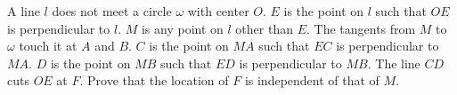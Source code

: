 A line $l$ does not meet a circle $\omega$ with center $O$. $E$ is the point on $l$ such that $OE$ is perpendicular to $l$. $M$ is any point on $l$ other than $E$. The tangents from $M$ to $\omega$ touch it at $A$ and $B$. $C$ is the point on $MA$ such that $EC$ is perpendicular to $MA$. $D$ is the point on $MB$ such that $ED$ is perpendicular to $MB$. The line $CD$ cuts $OE$ at $F$. Prove that the location of $F$ is independent of that of $M$.
